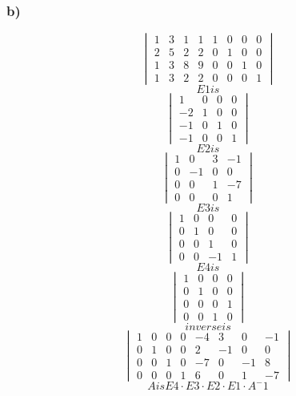 \documentclass[lineaire_algebra_oplossingen.tex]{subfiles}
\begin{document}
\subsubsection*{b)}
\[
\begin{vmatrix}
1 & 3 & 1 & 1 & 1 & 0 & 0 & 0\\
2 & 5 & 2 & 2 & 0 & 1 & 0 & 0\\
1 & 3 & 8 & 9 & 0 & 0 & 1 & 0\\
1 & 3 & 2 & 2 & 0 & 0 & 0 & 1
\end{vmatrix}
\]
\[ E1 is \]
\[
\begin{vmatrix}
1 & 0 & 0 & 0\\
-2 & 1 & 0 & 0\\
-1 & 0 & 1 & 0\\
-1 & 0 & 0 & 1
\end{vmatrix}
\]
\[ E2 is \]
\[
\begin{vmatrix}
1 & 0 & 3 & -1\\
0 & -1 & 0 & 0\\
0 & 0 & 1 & -7\\
0 & 0 & 0 & 1
\end{vmatrix}
\]
\[ E3 is \]
\[
\begin{vmatrix}
1 & 0 & 0 & 0\\
0 & 1 & 0 & 0\\
0 & 0 & 1 & 0\\
0 & 0 & -1 & 1
\end{vmatrix}
\]
\[ E4 is \]
\[
\begin{vmatrix}
1 & 0 & 0 & 0\\
0 & 1 & 0 & 0\\
0 & 0 & 0 & 1\\
0 & 0 & 1 & 0
\end{vmatrix}
\]
\[ inverse is  \]
\[
\begin{vmatrix}
1 & 0 & 0 & 0 & -4 & 3 & 0 & -1\\
0 & 1 & 0 & 0 & 2 & -1 & 0 & 0\\
0 & 0 & 1 & 0 & -7 & 0 & -1 & 8\\
0 & 0 & 0 & 1 & 6 & 0 & 1 & -7
\end{vmatrix}
\]
\[ A is E4 \cdot E3 \cdot E2 \cdot E1 \cdot A^-1 \]
\end{document}

